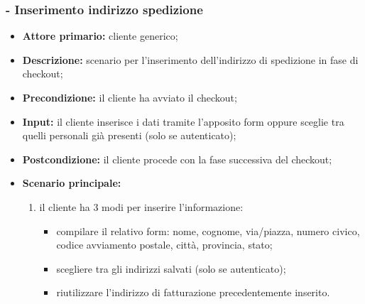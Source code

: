 \subsubsection{ - Inserimento indirizzo spedizione}
\begin{itemize}
    \item \textbf{Attore primario:} cliente generico;
    \item \textbf{Descrizione:} scenario per l'inserimento dell'indirizzo di spedizione in fase di checkout;
    \item \textbf{Precondizione:} il cliente ha avviato il checkout;
    \item \textbf{Input:} il cliente inserisce i dati tramite l'apposito form oppure sceglie tra quelli personali già presenti (solo se autenticato);
    \item \textbf{Postcondizione:} il cliente procede con la fase successiva del checkout;
    \item \textbf{Scenario principale:}
          \begin{enumerate}
              \item il cliente ha 3 modi per inserire l'informazione:
                    \begin{itemize}
                        \item compilare il relativo form: nome, cognome, via/piazza, numero civico, codice avviamento postale, città, provincia, stato;
                        \item scegliere tra gli indirizzi salvati (solo se autenticato);
                        \item riutilizzare l'indirizzo di fatturazione precedentemente inserito.
                    \end{itemize}
          \end{enumerate}
\end{itemize}

\stepsubUserCase
